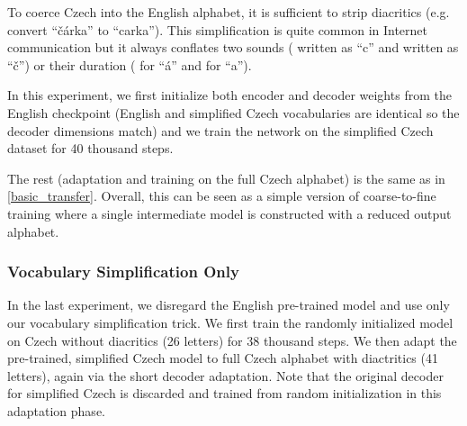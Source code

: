 To coerce Czech into the English alphabet, it is sufficient to strip diacritics (e.g. convert ``\v{c}\'arka'' to ``carka''). This simplification is quite common in Internet communication but it always conflates two sounds (\textipa{[ts]} written as ``c'' and \textipa{[tS]} written as ``\v{c}'')  or their duration (\textipa{[a:]} for ``\'a'' and \textipa{[a]} for ``a'').

In this experiment, we first initialize both encoder and decoder weights from the English checkpoint (English and simplified Czech vocabularies are identical so the decoder dimensions match) and we train the network on the simplified Czech dataset for 40 thousand steps.

The rest (adaptation and training on the full Czech alphabet)
is the same as in \cref{basic_transfer}.
%
Overall, this can be seen as a simple version of coarse-to-fine training where a single intermediate model is constructed with a reduced output alphabet.

\subsubsection{Vocabulary Simplification Only}
\label{sub_sec:simplification}





In the last experiment, we disregard the English pre-trained model and use only our vocabulary simplification trick. We first train the randomly initialized model on Czech without diacritics (26 letters) for 38 thousand steps. We then adapt the pre-trained, simplified Czech model to full Czech alphabet with diactritics (41 letters), again via the short decoder adaptation. Note that the original decoder for simplified Czech is discarded and trained from random initialization in this adaptation phase.



